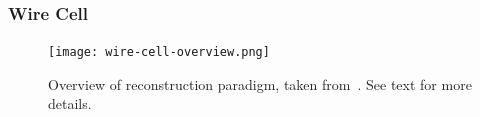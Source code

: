 




\subsubsection{Wire Cell}

\begin{figure}[!ht]
 \texttt{[image: wire-cell-overview.png]}
\caption[Overview of  reconstruction paradigm]{Overview of reconstruction paradigm, taken from~\cite{ref:wc_talk}. 
See text for more details.}
\label{wire-cell-overview}
\end{figure}


